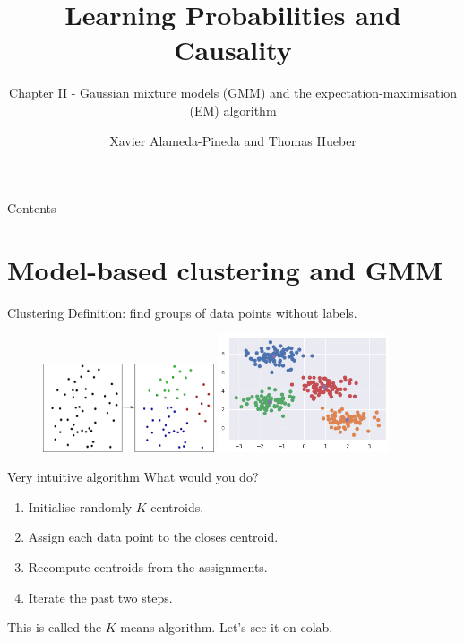 \documentclass{beamer}
\title{Learning Probabilities and Causality}
\subtitle{Chapter II - Gaussian mixture models (GMM) and the expectation-maximisation (EM) algorithm} %
\author[Xavi and Thomas]{Xavier Alameda-Pineda and Thomas Hueber}
\institute{Ensimag/Inria/CNRS/Univ. Grenoble-Alpes}
\date{}
\begin{document}
\begin{frame}
  \titlepage
\end{frame}

\begin{frame}{Contents}
 \tableofcontents
\end{frame}

\section{Model-based clustering and GMM}

\begin{frame}{Clustering}
    Definition: find groups of data points without labels.
    
    \begin{figure}
     \centering
     \includegraphics[width=0.45\textwidth]{fig/clustering}
     \hspace{5mm}
     \includegraphics[width=0.45\textwidth]{fig/clustering_done}
    \end{figure}
\end{frame}

\begin{frame}{Very intuitive algorithm}
    What would you do? \pause
    
    \begin{enumerate}
     \item Initialise randomly $K$ centroids.
     \item Assign each data point to the closes centroid.
     \item Recompute centroids from the assignments.
     \item Iterate the past two steps.
    \end{enumerate}\vspace{3mm}
    
    This is called the $K$-means algorithm. Let's see it on colab.
\end{frame}
\end{document}
